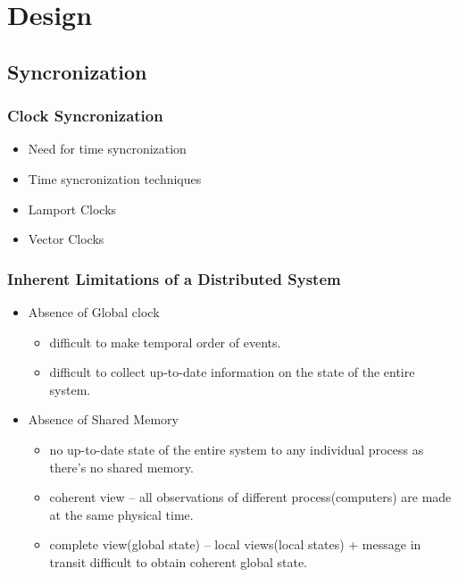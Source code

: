 \section{Design}

\subsection{Syncronization}

\begin{frame}
    \frametitle{Clock Syncronization}
\begin{itemize}
    \item Need for time syncronization
    \item Time syncronization techniques
    \item Lamport Clocks
    \item Vector Clocks
\end{itemize}
\end{frame}

\begin{frame}
    \frametitle{Inherent Limitations of a Distributed System}
    \begin{itemize}
        \item Absence of Global clock
        \begin{itemize}
            \item difficult to make temporal order of events.
            \item difficult to collect up-to-date information on the state of the entire system.
        \end{itemize}
        \item Absence of Shared Memory
        \begin{itemize}
            \item no up-to-date state of the entire system to any individual process as there's no shared memory.
            \item coherent view -- all observations of different process(computers) are made at the same physical time.
            \item complete view(global state) -- local views(local states) + message in transit difficult to obtain coherent global state.
        \end{itemize}
    \end{itemize}
\end{frame}

